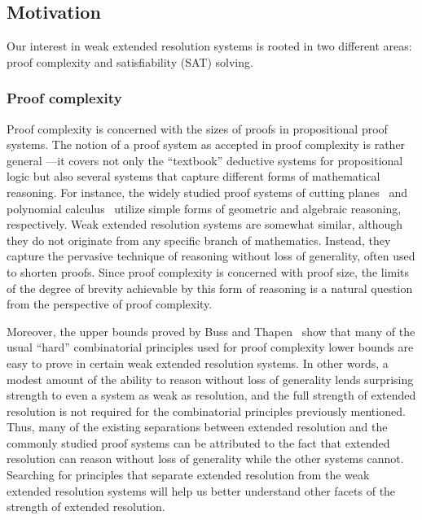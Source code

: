 \documentclass[10pt,a4paper]{article}
\begin{document}
\subsection{Motivation}
\label{sec:motivation}

Our interest in weak extended resolution systems
is rooted in two different areas:
proof complexity and satisfiability (SAT) solving.

\subsubsection{Proof complexity}
\label{sec:proof-complexity}

Proof complexity is concerned with the sizes of proofs in propositional proof systems.
The notion of a proof system as accepted in proof complexity is rather general%
---it covers not only the ``textbook'' deductive systems for propositional logic
but also several systems that capture different forms of mathematical reasoning.
For instance, the widely studied proof systems of
cutting planes~\cite{CCT87} and polynomial calculus~\cite{CEI96}
utilize simple forms of geometric and algebraic reasoning, respectively.
Weak extended resolution systems are somewhat similar,
although they do not originate from any specific branch of mathematics.
Instead, they capture the pervasive technique of
reasoning without loss of generality, often used to shorten proofs.
Since proof complexity is concerned with proof size,
the limits of the degree of brevity achievable by this form of reasoning
is a natural question from the perspective of proof complexity.

Moreover, the upper bounds proved by Buss and Thapen~\cite{BT21}
show that many of the usual ``hard'' combinatorial principles
used for proof complexity lower bounds are easy to prove
in certain weak extended resolution systems.
In other words, a modest amount of the ability to reason without loss of generality
lends surprising strength to even a system as weak as resolution,
and the full strength of extended resolution
is not required for the combinatorial principles previously mentioned.
Thus, many of the existing separations between extended resolution
and the commonly studied proof systems can be attributed to the fact
that extended resolution can reason without loss of generality
while the other systems cannot.
Searching for principles that separate extended resolution
from the weak extended resolution systems will help us
better understand other facets of the strength of extended resolution.
\end{document}
